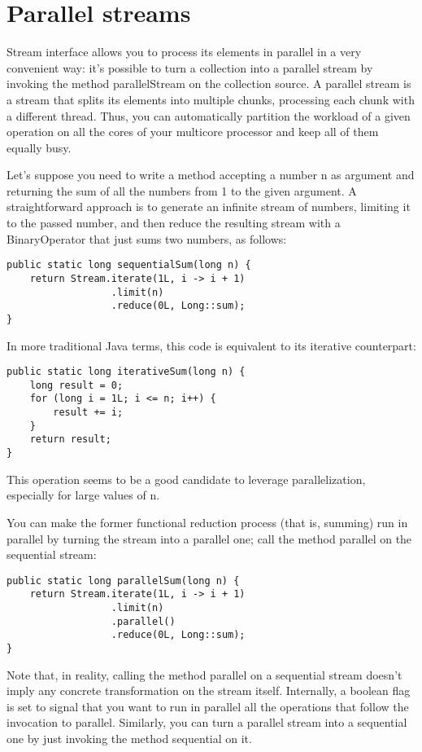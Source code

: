 \section{Parallel streams}

Stream interface allows you to process its elements in parallel in a very convenient way: it’s possible to turn a collection into a parallel stream by invoking the method parallelStream on the collection source. A parallel stream is a stream that splits its elements into multiple chunks, processing each chunk with a different thread. Thus, you can automatically partition the workload of a given operation on all the cores of your multicore processor and keep all of them equally busy.

Let’s suppose you need to write a method accepting a number n as argument and returning the sum of all the numbers from 1 to the given argument. A straightforward approach is to generate an infinite stream of numbers, limiting it to the passed number, and then reduce the resulting stream with a BinaryOperator that just sums two numbers, as follows:

\begin{lstlisting}
public static long sequentialSum(long n) {
	return Stream.iterate(1L, i -> i + 1)
				  .limit(n)
				  .reduce(0L, Long::sum);
}	
\end{lstlisting}

In more traditional Java terms, this code is equivalent to its iterative counterpart:

\begin{lstlisting}
public static long iterativeSum(long n) {
    long result = 0;
    for (long i = 1L; i <= n; i++) {
        result += i;
    }
    return result;
}	
\end{lstlisting}

This operation seems to be a good candidate to leverage parallelization, especially for large values of n.

You can make the former functional reduction process (that is, summing) run in parallel by turning the stream into a parallel one; call the method parallel on the sequential stream:

\begin{lstlisting}
public static long parallelSum(long n) {
	return Stream.iterate(1L, i -> i + 1)
				  .limit(n)
				  .parallel()
				  .reduce(0L, Long::sum);
}	
\end{lstlisting}

Note that, in reality, calling the method parallel on a sequential stream doesn’t imply any concrete transformation on the stream itself. Internally, a boolean flag is set to signal that you want to run in parallel all the operations that follow the invocation to parallel. Similarly, you can turn a parallel stream into a sequential one by just invoking the method sequential on it.

